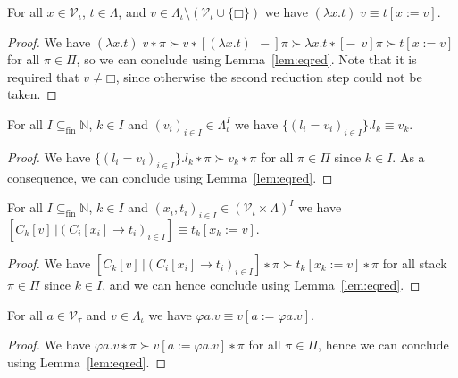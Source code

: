 \begin{theorem}
  For all $x ∈ \mathcal{V}_{ι}$, $t ∈ Λ$, and $v ∈ Λ_{ι} \setminus
  (\mathcal{V}_{ι} ∪ \{□\})$ we have $(λx.t)\;v ≡ t[x := v]$.
\end{theorem}
\begin{proof}
  We have ${(λx.t)\;v ∗ π} ≻ {v ∗ [(λx.t)\;\,{-}]π} ≻ {λx.t ∗ [{-}\;\,v]π} ≻
  t[x := v]$ for all $π ∈ Π$, so we can conclude using Lemma~\ref{lem:eqred}.
  Note that it is required that $v ≠ □$, since otherwise the second reduction
  step could not be taken.
\end{proof}

\begin{theorem}
  For all $I ⊆_{\text{fin}} \mathbb{N}$, $k ∈ I$ and $(v_i)_{i∈I} ∈ Λ_{ι}^I$
  we have $\{(l_i = v_i)_{i∈I}\}.l_k ≡ v_k$.
\end{theorem}
\begin{proof}
  We have ${\{(l_i = v_i)_{i∈I}\}.l_k ∗ π} ≻ {v_k ∗ π}$ for all $π ∈ Π$ since
  $k ∈ I$. As a consequence, we can conclude using Lemma~\ref{lem:eqred}.
\end{proof}

\begin{theorem}
  For all $I ⊆_{\text{fin}} \mathbb{N}$, $k ∈ I$ and $(x_i, t_i)_{i ∈ I} ∈
  (\mathcal{V}_{ι} × Λ)^I$ we have  $[C_k[v]\,| (C_i[x_i] → t_i)_{i∈I}] ≡
  t_k[x_k := v]$.
\end{theorem}
\begin{proof}
  We have ${[C_k[v]\,| (C_i[x_i] → t_i)_{i∈I}] ∗ π} ≻ {t_k[x_k := v] ∗ π}$
  for all stack $π ∈ Π$ since $k ∈ I$, and we can hence conclude using
  Lemma~\ref{lem:eqred}.
\end{proof}

\begin{theorem}
  For all $a ∈ \mathcal{V}_{τ}$ and $v ∈ Λ_{ι}$ we have
  ${φa.v} ≡ {v[a := φa.v]}$.
\end{theorem}
\begin{proof}
  We have ${φa.v ∗ π} ≻ {v[a := φa.v] ∗ π}$ for all $π ∈ Π$, hence we can
  conclude using Lemma~\ref{lem:eqred}.
\end{proof}

